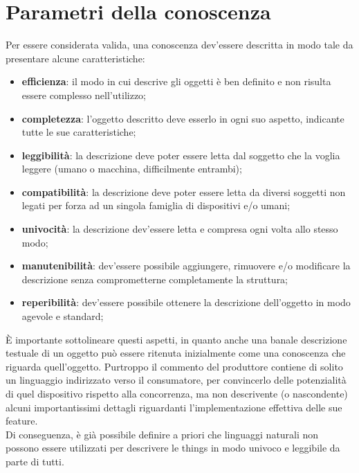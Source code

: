 \documentclass[12pt,a4paper,openright,oneside]{report}
\begin{document}
\section{Parametri della conoscenza}
Per essere considerata valida, una conoscenza dev'essere descritta in modo tale da presentare alcune caratteristiche:

\begin{itemize}
	\item \textbf{efficienza}: il modo in cui descrive gli oggetti è ben definito e non risulta essere complesso nell'utilizzo;
	\item \textbf{completezza}: l'oggetto descritto deve esserlo in ogni suo aspetto, indicante tutte le sue caratteristiche;
	\item \textbf{leggibilità}: la descrizione deve poter essere letta dal soggetto che la voglia leggere (umano o macchina, difficilmente entrambi);
	\item \textbf{compatibilità}: la descrizione deve poter essere letta da diversi soggetti non legati per forza ad un singola famiglia di dispositivi e/o umani;
	\item \textbf{univocità}: la descrizione dev'essere letta e compresa ogni volta allo stesso modo;
	\item \textbf{manutenibilità}: dev'essere possibile aggiungere, rimuovere e/o modificare la descrizione senza comprometterne completamente la struttura;
	\item \textbf{reperibilità}: dev'essere possibile ottenere la descrizione dell'oggetto in modo agevole e standard;
\end{itemize}

È importante sottolineare questi aspetti, in quanto anche una banale descrizione testuale di un oggetto può essere ritenuta inizialmente come una conoscenza che riguarda quell'oggetto. Purtroppo il commento del produttore contiene di solito un linguaggio indirizzato verso il consumatore, per convincerlo delle potenzialità di quel dispositivo rispetto alla concorrenza, ma non descrivente (o nascondente) alcuni importantissimi dettagli riguardanti l'implementazione effettiva delle sue feature.\\

Di conseguenza, è già possibile definire a priori che linguaggi naturali non possono essere utilizzati per descrivere le things in modo univoco e leggibile da parte di tutti.
\end{document}
